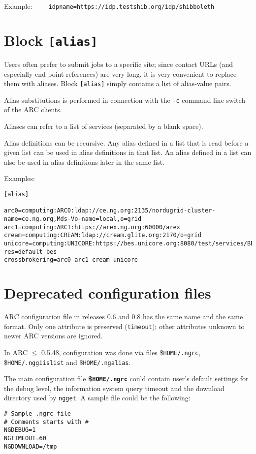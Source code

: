 Example:
\verb#    idpname=https://idp.testshib.org/idp/shibboleth#


\section{Block \texttt{[alias]}}

Users often prefer to submit jobs to a specific site; since contact URLs (and
especially end-point references) are very long, it is very convenient to replace
them with aliases. Block \texttt{[alias]} simply contains a list of
alias-value pairs.
 
 Alias substitutions is performed in connection with the \verb#-c# command line
 switch of the ARC clients.

 Aliases can refer to a list of services (separated by a blank space).

 Alias definitions can be recursive. Any alias
 defined in a list that is read before a given list can be used in
 alias definitions in that list. An alias defined in a list can also
 be used in alias definitions later in the same list.
 
 Examples:
\begin{verbatim}
[alias]

arc0=computing:ARC0:ldap://ce.ng.org:2135/nordugrid-cluster-name=ce.ng.org,Mds-Vo-name=local,o=grid
arc1=computing:ARC1:https://arex.ng.org:60000/arex
cream=computing:CREAM:ldap://cream.glite.org:2170/o=grid
unicore=computing:UNICORE:https://bes.unicore.org:8080/test/services/BESFactory?res=default_bes
crossbrokering=arc0 arc1 cream unicore
\end{verbatim}

\section{Deprecated configuration files}

ARC configuration file in releases 0.6 and 0.8 has the same name and the same
format. Only one attribute is preserved (\texttt{timeout}); other attributes
unknown to newer ARC versions are ignored.

In ARC $\leq$ 0.5.48, configuration was done via files {\$}\texttt{HOME/.ngrc},
{\$}\texttt{HOME/.nggiislist} and {\$}\texttt{HOME/.ngalias}.

The main configuration file \textbf{{\$}\texttt{HOME/.ngrc}} could contain
user's default settings for the debug level, the information system
query timeout and the download directory used by \texttt{ngget}. A
sample file could be the following:
\begin{verbatim}
# Sample .ngrc file
# Comments starts with #
NGDEBUG=1
NGTIMEOUT=60
NGDOWNLOAD=/tmp
\end{verbatim}

